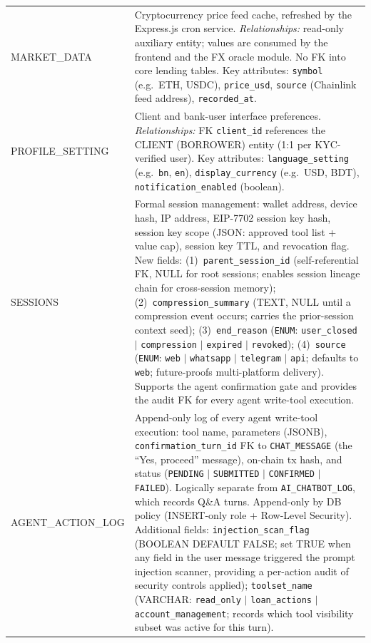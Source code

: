 \documentclass[12pt,a4paper]{report}
\begin{document}
\begin{table}[H]
\begin{tabular}{p{4cm}p{9.5cm}}
MARKET\_DATA & Cryptocurrency price feed cache, refreshed by the Express.js cron service. \textit{Relationships:} read-only auxiliary entity; values are consumed by the frontend and the FX oracle module. No FK into core lending tables. Key attributes: \texttt{symbol} (e.g.\ ETH, USDC), \texttt{price\_usd}, \texttt{source} (Chainlink feed address), \texttt{recorded\_at}. \\
PROFILE\_SETTING & Client and bank-user interface preferences. \textit{Relationships:} FK \texttt{client\_id} references the CLIENT (BORROWER) entity (1:1 per KYC-verified user). Key attributes: \texttt{language\_setting} (e.g.\ \texttt{bn}, \texttt{en}), \texttt{display\_currency} (e.g.\ USD, BDT), \texttt{notification\_enabled} (boolean). \\
\hline
SESSIONS & Formal session management: wallet address, device hash, IP address,
EIP-7702 session key hash, session key scope (JSON: approved tool list + value cap),
session key TTL, and revocation flag. New fields: (1)~\texttt{parent\_session\_id}
(self-referential FK, NULL for root sessions; enables session lineage chain for
cross-session memory); (2)~\texttt{compression\_summary} (TEXT, NULL until a
compression event occurs; carries the prior-session context seed); (3)~\texttt{end\_reason}
(\texttt{ENUM}: \texttt{user\_closed} $|$ \texttt{compression} $|$ \texttt{expired}
$|$ \texttt{revoked}); (4)~\texttt{source} (\texttt{ENUM}: \texttt{web}
$|$ \texttt{whatsapp} $|$ \texttt{telegram} $|$ \texttt{api}; defaults to
\texttt{web}; future-proofs multi-platform delivery). Supports the agent
confirmation gate and provides the audit FK for every agent write-tool execution. \\
\hline
AGENT\_ACTION\_LOG & Append-only log of every agent write-tool execution: tool name, parameters (JSONB), \texttt{confirmation\_turn\_id} FK to \texttt{CHAT\_MESSAGE} (the ``Yes, proceed'' message), on-chain tx hash, and status (\texttt{PENDING} $|$ \texttt{SUBMITTED} $|$ \texttt{CONFIRMED} $|$ \texttt{FAILED}). Logically separate from \texttt{AI\_CHATBOT\_LOG}, which records Q\&A turns. Append-only by DB policy (INSERT-only role + Row-Level Security). Additional fields: \texttt{injection\_scan\_flag} (BOOLEAN DEFAULT FALSE; set TRUE when any field in the user message triggered the prompt injection scanner, providing a per-action audit of security controls applied); \texttt{toolset\_name} (VARCHAR: \texttt{read\_only} $|$ \texttt{loan\_actions} $|$ \texttt{account\_management}; records which tool visibility subset was active for this turn). \\

\end{tabular}
\end{table}
\end{document}
